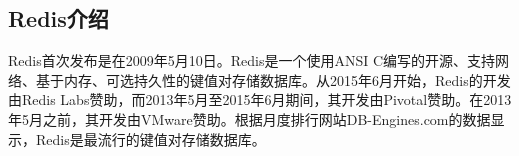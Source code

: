 \documentclass[../../../interview-questions.tex]{subfiles}
\begin{document}
\subsection{Redis介绍}

Redis首次发布是在2009年5月10日。Redis是一个使用ANSI C编写的开源、支持网络、基于内存、可选持久性的键值对存储数据库。从2015年6月开始，Redis的开发由Redis Labs赞助，而2013年5月至2015年6月期间，其开发由Pivotal赞助。在2013年5月之前，其开发由VMware赞助。根据月度排行网站DB-Engines.com的数据显示，Redis是最流行的键值对存储数据库。
\end{document}
